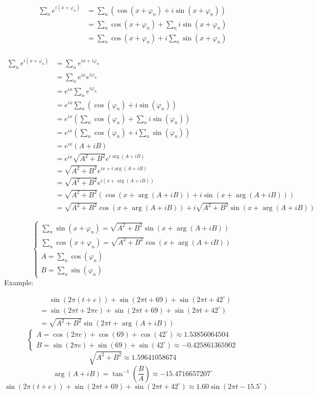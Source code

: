 \documentclass[12pt,a4paper]{article}
\begin{document}
\[\begin{aligned}
\sum\limits_{n}e^{i(x+\varphi_n)}&=\sum\limits_{n}(\cos(x+\varphi_n)+i\sin(x+\varphi_n))\\
&=\sum\limits_{n}\cos(x+\varphi_n)+\sum\limits_{n}i\sin(x+\varphi_n)\\
&=\sum\limits_{n}\cos(x+\varphi_n)+i\sum\limits_{n}\sin(x+\varphi_n)\\
\end{aligned}\]

\[\begin{aligned}
\sum\limits_{n}e^{i(x+\varphi_n)}&=\sum\limits_{n}e^{ix+i\varphi_n}\\
&=\sum\limits_{n}e^{ix}e^{i\varphi_n}\\
&=e^{ix}\sum\limits_{n}e^{i\varphi_n}\\
&=e^{ix}\sum\limits_{n}(\cos(\varphi_n)+i\sin(\varphi_n))\\
&=e^{ix}\left(\sum\limits_{n}\cos(\varphi_n)+\sum\limits_{n}i\sin(\varphi_n)\right)\\
&=e^{ix}\left(\sum\limits_{n}\cos(\varphi_n)+i\sum\limits_{n}\sin(\varphi_n)\right)\\
&=e^{ix}(A+iB)\\
&=e^{ix}\sqrt{A^2+B^2}e^{i\arg(A+iB)}\\
&=\sqrt{A^2+B^2}e^{ix+i\arg(A+iB)}\\
&=\sqrt{A^2+B^2}e^{i(x+\arg(A+iB))}\\
&=\sqrt{A^2+B^2}(\cos(x+\arg(A+iB))+i\sin(x+\arg(A+iB)))\\
&=\sqrt{A^2+B^2}\cos(x+\arg(A+iB))+i\sqrt{A^2+B^2}\sin(x+\arg(A+iB))
\end{aligned}\]

\[\boxed{
\begin{cases}
\sum\limits_{n}\sin(x+\varphi_n)=\sqrt{A^2+B^2}\sin(x+\arg(A+iB))\\
\sum\limits_{n}\cos(x+\varphi_n)=\sqrt{A^2+B^2}\cos(x+\arg(A+iB))\\
A=\sum\limits_{n}\cos(\varphi_n)\\
B=\sum\limits_{n}\sin(\varphi_n)
\end{cases}}\] 
\newpage
Example:

\[\begin{aligned}
&\phantom{=}\sin(2\pi(t+e))+\sin(2\pi t+69)+\sin(2\pi t+42^\circ)\\
&=\sin(2\pi t+2\pi e)+\sin(2\pi t+69)+\sin(2\pi t+42^\circ)\\
&=\sqrt{A^2+B^2}\sin(2\pi t+\arg(A+iB))
\end{aligned}\]
\[\begin{cases}
A=\cos(2\pi e)+\cos(69)+\cos(42^\circ)\approx1.53856064504\\
B=\sin(2\pi e)+\sin(69)+\sin(42^\circ)\approx-0.425861365902
\end{cases}\]
\[\sqrt{A^2+B^2}\approx1.59641058674\]
\[\arg(A+iB)=\tan^{-1}\left(\frac BA\right)\approx-15.4716657207^\circ\]
\[\sin(2\pi(t+e))+\sin(2\pi t+69)+\sin(2\pi t+42^\circ)\approx\boxed{1.60\sin(2\pi t-15.5^\circ)}\]
\end{document}
